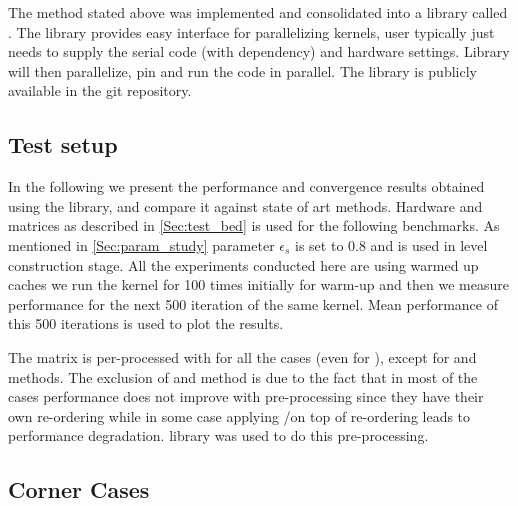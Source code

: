 The method stated above was implemented and consolidated into a library called \RACE. The library provides easy interface for parallelizing kernels, user typically just needs to supply the serial code (with dependency) and hardware settings. Library will then parallelize, pin and run the code in parallel. The library is publicly available in the git repository. %

\subsection{Test setup}
In the following we present the performance and convergence results obtained using the library, and compare it against state of art methods. Hardware and matrices as described in \cref{Sec:test_bed} is used for the following benchmarks. As mentioned in \cref{Sec:param_study} parameter $\epsilon_s$ is set to 0.8 and \RCM is used in level construction stage. All the experiments conducted here are using warmed up caches \ie we run the kernel for 100 times initially for warm-up and then we measure performance for the next 500 iteration of the same kernel. Mean performance of this 500 iterations is used to plot the results. 

The matrix is per-processed with \RCM for all the cases (even for \SpMV), except for \MC and \ABMC methods. The exclusion of \MC and \ABMC method is due to the fact that in most of the cases performance does not improve with \RCM pre-processing since they have their own re-ordering while in some case applying \MC/\ABMC on top of \RCM re-ordering leads to performance degradation. \SPMP \cite{SpMP} library was used to do this \RCM pre-processing.

\subsection{Corner Cases}


